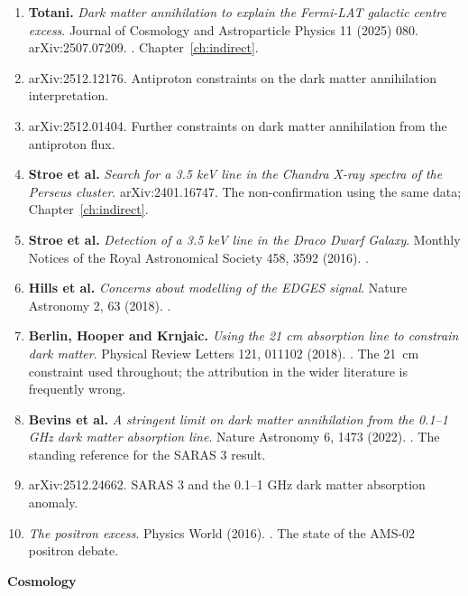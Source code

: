 \begin{enumerate}[leftmargin=1.4em,itemsep=4pt,start=20]
\item \textbf{Totani.} \emph{Dark matter annihilation to explain the
Fermi-LAT galactic centre excess}. Journal of Cosmology and Astroparticle
Physics 11 (2025) 080. arXiv:2507.07209.
. Chapter~\ref{ch:indirect}.
\item arXiv:2512.12176. Antiproton constraints on the dark matter
annihilation interpretation.
\item arXiv:2512.01404. Further constraints on dark matter annihilation from
the antiproton flux.
\item \textbf{Stroe et al.} \emph{Search for a 3.5 keV line in the Chandra X-ray
spectra of the Perseus cluster}. arXiv:2401.16747. The non-confirmation
using the same data; Chapter~\ref{ch:indirect}.
\item \textbf{Stroe et al.} \emph{Detection of a 3.5 keV line in the Draco
Dwarf Galaxy}. Monthly Notices of the Royal Astronomical Society 458, 3592
(2016). .
\item \textbf{Hills et al.} \emph{Concerns about modelling of the EDGES
signal}. Nature Astronomy 2, 63 (2018).
.
\item \textbf{Berlin, Hooper and Krnjaic.} \emph{Using the 21 cm absorption
line to constrain dark matter}. Physical Review Letters 121, 011102 (2018).
. The 21~cm constraint used
throughout; the attribution in the wider literature is frequently wrong.
\item \textbf{Bevins et al.} \emph{A stringent limit on dark matter
annihilation from the 0.1--1 GHz dark matter absorption line}. Nature
Astronomy 6, 1473 (2022). . The
standing reference for the SARAS 3 result.
\item arXiv:2512.24662. SARAS 3 and the 0.1--1 GHz dark matter absorption
anomaly.
\item \emph{The positron excess}. Physics World (2016).
. The state
of the AMS-02 positron debate.
\end{enumerate}

\vspace{8pt}
{\sffamily\bfseries\small Cosmology}

